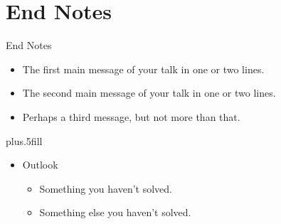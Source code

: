 \documentclass{beamer}
\begin{document}
\section{End Notes}

\begin{frame}{End Notes}
  \begin{itemize}
  \item
    The \alert{first main message} of your talk in one or two lines.
  \item
    The \alert{second main message} of your talk in one or two lines.
  \item
    Perhaps a \alert{third message}, but not more than that.
  \end{itemize}
  
  \vskip0pt plus.5fill
  \begin{itemize}
  \item
    Outlook
    \begin{itemize}
    \item
      Something you haven't solved.
    \item
      Something else you haven't solved.
    \end{itemize}
  \end{itemize}
\end{frame}
\end{document}
